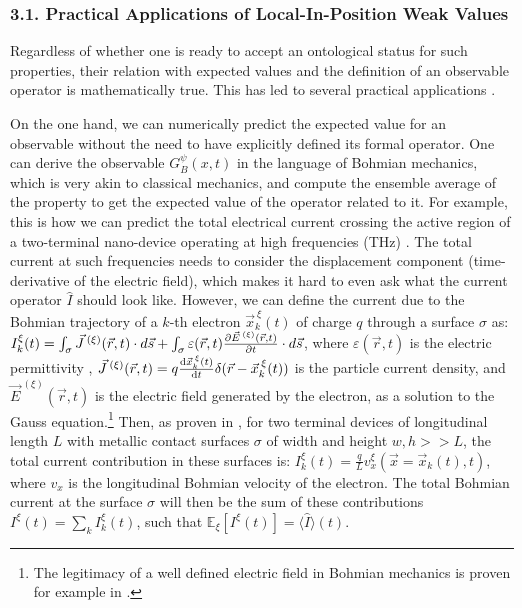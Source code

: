\documentclass[11pt, a4paper]{article} %
\begin{document}
\subsubsection*{3.1. Practical Applications of Local-In-Position Weak Values}\vspace{-0.15cm}

Regardless of whether one is ready to accept an ontological status for such properties, their relation with expected values and the definition of an observable operator is mathematically true. This has led to several practical applications \cite{DevInPosition1, DevInPosition2}. 

On the one hand, we can numerically predict the expected value for an observable without the need to have explicitly defined its formal operator. One can derive the observable $G^\psi_B(x,t)$ in the language of Bohmian mechanics, which is very akin to classical mechanics, and compute the ensemble average of the property to get the expected value of the operator related to it. For example, this is how we can predict the total electrical current crossing the active region of a two-terminal nano-device operating at high frequencies (THz) \cite{equiv, Pel}. The total current at such frequencies needs to consider the displacement component (time-derivative of the electric field), which makes it hard to even ask what the current operator $\hat{I}$ should look like. However, we can define the current due to the Bohmian trajectory of a $k$-th electron $\vec{x}_k^{\:\xi}(t)$ of charge $q$ through a surface $\sigma$ as: $I_k^\xi(t)=\int_\sigma \vec{J}^{\:(\xi)}(\vec{r},t)\cdot d\vec{s}+\int_\sigma \varepsilon(\vec{r},t)\pdv{\vec{E}^{\:(\xi)}(\vec{r},t)}{t}\cdot d\vec{s}$, where $\varepsilon(\vec{r},t)$ is the electric permittivity , $\vec{J}^{\:(\xi)}(\vec{r},t)=q\dv{\vec{x}_k^{\:\xi}(t)}{t}\delta(\vec{r}-\vec{x}_k^{\:\xi}(t))$ is the particle current density, and $\vec{E}^{\:(\xi)}(\vec{r},t)$ is the electric field generated by the electron, as a solution to the Gauss equation.\footnote{The legitimacy of a well defined electric field in Bohmian mechanics is proven for example in \cite{lightMatter}.} Then, as proven in \cite{Pel}, for two terminal devices of longitudinal length $L$ with metallic contact surfaces $\sigma$ of width and height $w,h>>L$, the total current contribution in these surfaces is: $I^\xi_k(t)=\frac{q}{L}v_x^\xi(\vec{x}=\vec{x}_k(t), t) $, where $v_x$ is the longitudinal Bohmian velocity of the electron. The total Bohmian current at the surface $\sigma$ will then be the sum of these contributions $I^\xi(t)=\sum_k I^\xi_k(t)$, such that $\mathbb{E}_\xi [I^\xi(t)]=\langle \hat{I}\rangle(t)$. 
\end{document}
